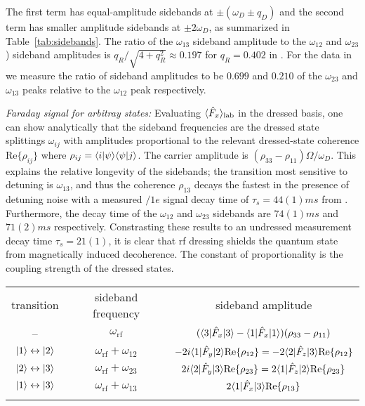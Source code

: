 \documentclass[aps,prl,reprint,superscriptaddress,floatfix]{revtex4-1}
\begin{document}
The first term has equal-amplitude sidebands at $\pm(\omega_D \pm q_D)$ and the second term has smaller amplitude sidebands at $\pm 2\omega_D$, as summarized in Table~\ref{tab:sidebands}.
The ratio of the $\omega_{13}$ sideband amplitude to the $\omega_{12}$ and $\omega_{23}$) sideband amplitudes is $q_R/\sqrt{4+q_R^2} \approx 0.197$ for $q_R = 0.402$ in .
For the data in  we measure the ratio of sideband amplitudes to be $0.699$ and $0.210$ of the $\omega_{23}$ and $\omega_{13}$ peaks relative to the $\omega_{12}$ peak respectively.

\textit{Faraday signal for arbitray states:}
Evaluating $\langle \hat{F}_x \rangle_{\text{lab}}$ in the dressed basis, one can show analytically that the sideband frequencies are the dressed state splittings $\omega_{ij}$ with amplitudes proportional to the relevant dressed-state coherence $\text{Re}\{\rho_{ij}\}$ where $\rho_{ij} = \langle i \vert \psi \rangle \langle \psi \vert j \rangle $.
The carrier amplitude is $(\rho_{33} - \rho_{11}) \Omega / \omega_D$.
This explains the relative longevity of the sidebands; the transition most sensitive to detuning is $\omega_{13}$, and thus the coherence $\rho_{13}$ decays the fastest in the presence of detuning noise with a measured $/1e$ signal decay time of $\tau_{s}=44(1)\unit{ms}$ from . 
Furthermore, the decay time of the $\omega_{12}$ and $\omega_{23}$ sidebands are $74(1)\unit{ms}$ and $71(2)\unit{ms}$ respectively. 
Constrasting these results to an undressed measurement decay time $\tau_{s}=21(1)$, it is clear that rf dressing shields the quantum state from magnetically induced decoherence.
The constant of proportionality is the coupling strength of the dressed states.
\begin{table*}[t]
\label{tab:sidebands_arb}
\begin{tabular}{ccc}
\hhline{===}
transition & sideband frequency & sideband amplitude \\ \hhline{---}
 -- & $\omega_{\text{rf}}$ & $(\langle 3 \vert  \hat{F}_x \vert 3 \rangle  - \langle 1 \vert  \hat{F}_x \vert 1 \rangle ) (\rho_{33} - \rho_{11})$ \\
 $\vert 1 \rangle  \leftrightarrow \vert 2 \rangle $ & $\omega_{\text{rf}} + \omega_{12}$ & $-2i \langle 1 \vert  \hat{F}_y \vert 2 \rangle  \text{Re}\{\rho_{12}\} = -2 \langle 2 \vert  \hat{F}_z \vert 3 \rangle  \text{Re}\{\rho_{12}\} $ \\
 $\vert 2 \rangle  \leftrightarrow \vert 3 \rangle $ & $\omega_{\text{rf}} + \omega_{23}$ & $2i \langle 2 \vert  \hat{F}_y \vert 3 \rangle  \text{Re}\{\rho_{23}\} = 2 \langle 1 \vert  \hat{F}_z \vert 2 \rangle  \text{Re}\{\rho_{23}\}$ \\
 $\vert 1 \rangle  \leftrightarrow \vert 3 \rangle $ & $\omega_{\text{rf}} + \omega_{13}$ & $2 \langle 1 \vert  \hat{F}_x \vert 3 \rangle  \text{Re}\{\rho_{13}\}$ \\ [1ex]\hhline{===}
\end{tabular}
\end{table*}
\end{document}
